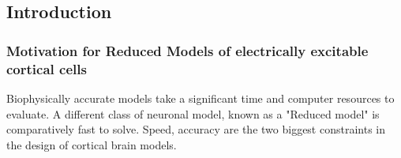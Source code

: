 \documentclass{report}
\begin{document}
\begin{itemize}



\chapter{Introduction}

\subsection*{Motivation for Reduced Models of electrically excitable cortical cells}

Biophysically accurate models take a significant time and computer resources to evaluate. A different class of neuronal model, known as a "Reduced model" is comparatively fast to solve. Speed, accuracy are the two biggest constraints in the design of cortical brain models. 


\end{itemize}
\end{document}
